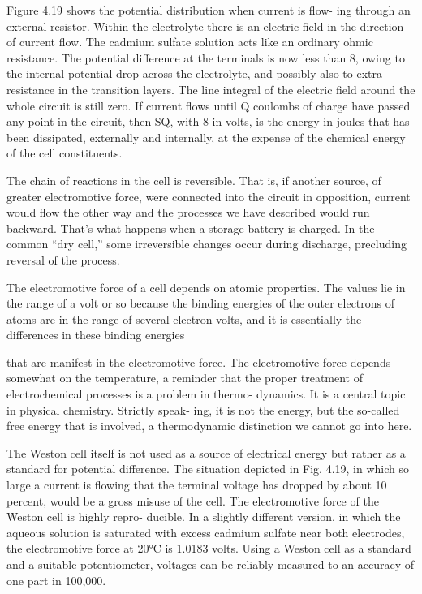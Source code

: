 Figure 4.19 shows the potential distribution when current is flow-
ing through an external resistor. Within the electrolyte there is an
electric field in the direction of current flow. The cadmium sulfate
solution acts like an ordinary ohmic resistance. The potential difference
at the terminals is now less than 8, owing to the internal potential
drop across the electrolyte, and possibly also to extra resistance
in the transition layers. The line integral of the electric field
around the whole circuit is still zero. If current flows until Q coulombs
of charge have passed any point in the circuit, then SQ, with
8 in volts, is the energy in joules that has been dissipated, externally
and internally, at the expense of the chemical energy of the cell
constituents.

The chain of reactions in the cell is reversible. That is, if another
source, of greater electromotive force, were connected into the circuit
in opposition, current would flow the other way and the processes
we have described would run backward. That's what happens when
a storage battery is charged. In the common ``dry cell,'' some
irreversible changes occur during discharge, precluding reversal of
the process.

The electromotive force of a cell depends on atomic properties.
The values lie in the range of a volt or so because the binding energies
of the outer electrons of atoms are in the range of several electron
volts, and it is essentially the differences in these binding energies

that are manifest in the electromotive force. The electromotive force
depends somewhat on the temperature, a reminder that the proper
treatment of electrochemical processes is a problem in thermo-
dynamics. It is a central topic in physical chemistry. Strictly speak-
ing, it is not the energy, but the so-called free energy that is involved,
a thermodynamic distinction we cannot go into here.

The Weston cell itself is not used as a source of electrical energy but
rather as a standard for potential difference. The situation depicted
in Fig. 4.19, in which so large a current is flowing that the terminal
voltage has dropped by about 10 percent, would be a gross misuse of
the cell. The electromotive force of the Weston cell is highly repro-
ducible. In a slightly different version, in which the aqueous solution
is saturated with excess cadmium sulfate near both electrodes, the
electromotive force at 20°C is 1.0183 volts. Using a Weston cell as
a standard and a suitable potentiometer, voltages can be reliably
measured to an accuracy of one part in 100,000.


